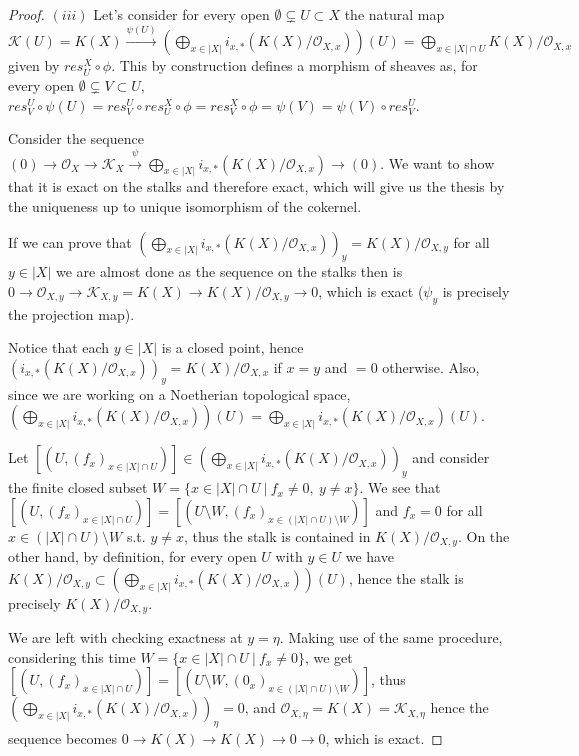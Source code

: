 \documentclass{article}
\begin{document}
\begin{proof}
    $(iii)$ Let's consider for every open $\emptyset\subsetneq U\subset X$ the
    natural map $\mathcal{K}(U)=K(X)\xrightarrow{\psi(U)}
    (\bigoplus_{x\in |X|}i_{x,*}(K(X)/\mathcal{O}_{X,x}))(U)=
    \bigoplus_{x\in |X|\cap U}K(X)/\mathcal{O}_{X,x}$ given by
    $res^X_U\circ\phi$. This by construction defines a morphism of sheaves as,
    for every open $\emptyset\subsetneq V\subset U$,
    $res^U_V\circ\psi(U)=res^U_V\circ res^X_U\circ\phi=res^X_V\circ\phi=\psi(V)=
    \psi(V)\circ res^U_V$.

    Consider the sequence
    $(0)\rightarrow\mathcal{O}_X\rightarrow\mathcal{K}_X\xrightarrow
    {\psi}\bigoplus_{x\in |X|}i_{x,*}(K(X)/\mathcal{O}_{X,x})\rightarrow (0)$.
    We want to show that it is exact on the stalks and therefore exact, which
    will give us the thesis by the uniqueness up to unique isomorphism of the
    cokernel.

    If we can prove that $(\bigoplus_{x\in
    |X|}i_{x,*}(K(X)/\mathcal{O}_{X,x}))_y=K(X)/\mathcal{O}_{X,y}$ for all $y\in
    |X|$ we are almost done as the sequence on the stalks then is
    $0\rightarrow\mathcal{O}_{X,y}\rightarrow\mathcal{K}_{X,y}=K(X)\rightarrow
    K(X)/\mathcal{O}_{X,y}\rightarrow 0$, which is exact ($\psi_y$ is precisely
    the projection map).

    Notice that each $y\in |X|$ is a closed point, hence
    $(i_{x,*}(K(X)/\mathcal{O}_{X,x}))_y=K(X)/\mathcal{O}_{X,x}$ if $x=y$ and
    $=0$ otherwise. Also, since we are working on a Noetherian topological
    space, $(\bigoplus_{x\in
    |X|}i_{x,*}(K(X)/\mathcal{O}_{X,x}))(U)=\bigoplus_{x\in
    |X|}i_{x,*}(K(X)/\mathcal{O}_{X,x})(U)$.
    
    Let $[(U,(f_x)_{x\in |X|\cap U})]\in(\bigoplus_{x\in |X|}i_{x,*}(K(X)/
    \mathcal{O}_{X,x}))_y$ and consider the finite closed subset
    $W=\{x\in |X|\cap U\ |\ f_x\neq 0,\ y\neq x\}$. We see that $[(U,(f_x)_{x\in
    |X|\cap U})]=[(U\setminus W,(f_x)_{x\in (|X|\cap U)\setminus W})]$ and
    $f_x=0$ for all $x\in (|X|\cap U)\setminus W$ s.t. $y\neq x$, thus the stalk
    is contained in $K(X)/\mathcal{O}_{X,y}$. On the other hand, by definition,
    for every open $U$ with $y\in U$ we have $K(X)/\mathcal{O}_{X,y}\subset
    (\bigoplus_{x\in|X|}i_{x,*}(K(X)/\mathcal{O}_{X,x}))(U)$, hence the stalk is
    precisely $K(X)/\mathcal{O}_{X,y}$.
    
    We are left with checking exactness at $y=\eta$. Making use of the same
    procedure, considering this time $W=\{x\in |X|\cap U\ |\ f_x\neq 0\}$, we
    get $[(U,(f_x)_{x\in |X|\cap U})]=[(U\setminus W,(0_x)_{x\in (|X|\cap
    U)\setminus W})]$, thus $(\bigoplus_{x\in |X|}i_{x,*}(K(X)/
    \mathcal{O}_{X,x}))_\eta=0$, and $\mathcal{O}_{X,\eta}=K(X)=
    \mathcal{K}_{X,\eta}$ hence the sequence becomes
    $0\rightarrow K(X)\rightarrow K(X)\rightarrow 0\rightarrow 0$, which is
    exact.
\end{proof}
\end{document}
